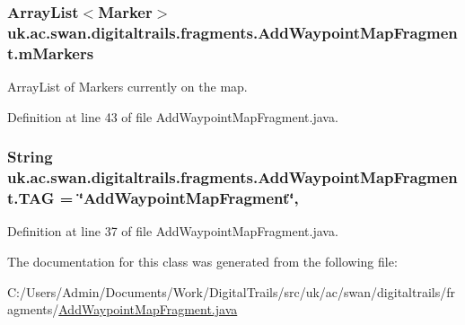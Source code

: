 \hypertarget{classuk_1_1ac_1_1swan_1_1digitaltrails_1_1fragments_1_1_add_waypoint_map_fragment_a613eb88a3337be436348415c671521c7}{
\subsubsection[{m\+Markers}]{\setlength{\rightskip}{0pt plus 5cm}Array\+List$<$Marker$>$ uk.\+ac.\+swan.\+digitaltrails.\+fragments.\+Add\+Waypoint\+Map\+Fragment.\+m\+Markers\hspace{0.3cm}{\ttfamily [private]}}}\label{classuk_1_1ac_1_1swan_1_1digitaltrails_1_1fragments_1_1_add_waypoint_map_fragment_a613eb88a3337be436348415c671521c7}


Array\+List of Markers currently on the map. 



Definition at line 43 of file Add\+Waypoint\+Map\+Fragment.\+java.

\hypertarget{classuk_1_1ac_1_1swan_1_1digitaltrails_1_1fragments_1_1_add_waypoint_map_fragment_a11bfffdb952e3c72ea51bc5b6ef70d9e}{
\subsubsection[{T\+A\+G}]{\setlength{\rightskip}{0pt plus 5cm}String uk.\+ac.\+swan.\+digitaltrails.\+fragments.\+Add\+Waypoint\+Map\+Fragment.\+T\+A\+G = \char`\"{}Add\+Waypoint\+Map\+Fragment\char`\"{}\hspace{0.3cm}{\ttfamily [static]}, {\ttfamily [private]}}}\label{classuk_1_1ac_1_1swan_1_1digitaltrails_1_1fragments_1_1_add_waypoint_map_fragment_a11bfffdb952e3c72ea51bc5b6ef70d9e}


Definition at line 37 of file Add\+Waypoint\+Map\+Fragment.\+java.



The documentation for this class was generated from the following file\+:\begin{DoxyCompactItemize}
\item 
C\+:/\+Users/\+Admin/\+Documents/\+Work/\+Digital\+Trails/src/uk/ac/swan/digitaltrails/fragments/\hyperlink{_add_waypoint_map_fragment_8java}{Add\+Waypoint\+Map\+Fragment.\+java}\end{DoxyCompactItemize}
